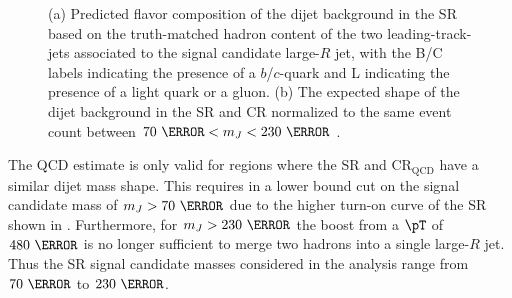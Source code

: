 \begin{figure}[!htbp]
\centering
{}\hfill
{}

\caption{(a) Predicted flavor composition of the dijet background in the SR based on the truth-matched hadron content of the two leading-\pt track-jets associated to the signal candidate large-$R$ jet, with the B/C labels indicating the presence of a $b$/$c$-quark and L indicating the presence of a light quark or a gluon. (b) The expected shape of the dijet background in the SR and CR normalized to the same event count between $70~\GeV < m_{J} < 230~\GeV$ \cite{ATLAS-CONF-2018-052}.}
\label{fig:event_selection}
\end{figure}

The QCD estimate is only valid for regions where the SR and
$\text{CR}_{\text{QCD}}$ have a similar dijet mass shape.  This requires in a
lower bound cut on the signal candidate mass of $m_{J} > 70~\GeV$ due to
the higher turn-on curve of the SR shown in .
Furthermore, for $m_{J} > 230~\GeV$ the boost from a $\pT$ of $480~\GeV$ is no
longer sufficient to merge two hadrons into a single large-$R$ jet.  Thus the
SR signal candidate masses considered in the analysis range from $70~\GeV$
to $230~\GeV$.

